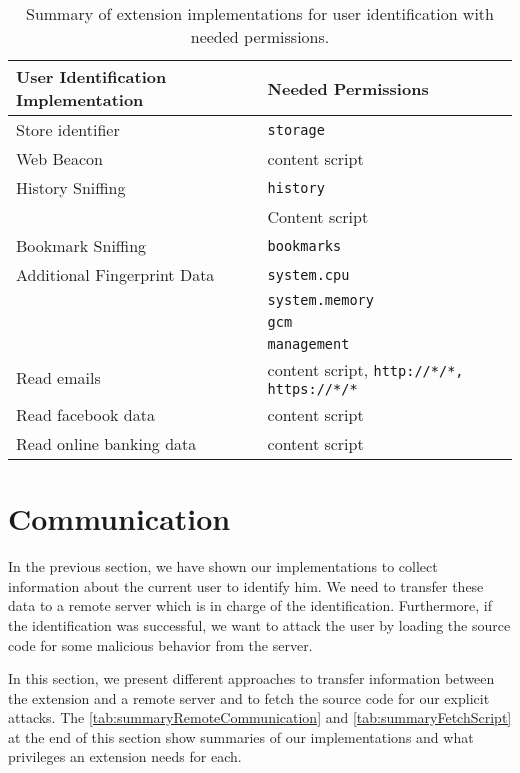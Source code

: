 	\begin{table}
		\centering
		\begin{tabular}{|l|l|} \hline 
			\textbf{User Identification Implementation} & \textbf{Needed Permissions} \\ \hline
			Store identifier & \texttt{storage} \\
			\hline
			Web Beacon & content script \\
			\hline
			History Sniffing & \texttt{history} \\
			& Content script \\
			Bookmark Sniffing & \texttt{bookmarks} \\
			\hline
			Additional Fingerprint Data & \texttt{system.cpu} \\
			& \texttt{system.memory} \\
			& \texttt{gcm} \\
			& \texttt{management} \\
			\hline
			Read emails & content script, \texttt{http://*/*, https://*/*} \\
			Read facebook data & content script \\
			Read online banking data & content script \\
			\hline
		\end{tabular}
		\caption{Summary of extension implementations for user identification with needed permissions.}
		\label{tab:summaryUserIdentification}
	\end{table}

	
	
	
	
\clearpage
\section{Communication}
\label{sec:communication}

	In the previous section, we have shown our implementations to collect information about the current user to identify him. We need to transfer these data to a remote server which is in charge of the identification. Furthermore, if the identification was successful, we want to attack the user by loading the source code for some malicious behavior from the server.
	
	In this section, we present different approaches to transfer information between the extension and a remote server and to fetch the source code for our explicit attacks. The \autoref{tab:summaryRemoteCommunication} and \autoref{tab:summaryFetchScript} at the end of this section show summaries of our implementations and what privileges an extension needs for each.
	
